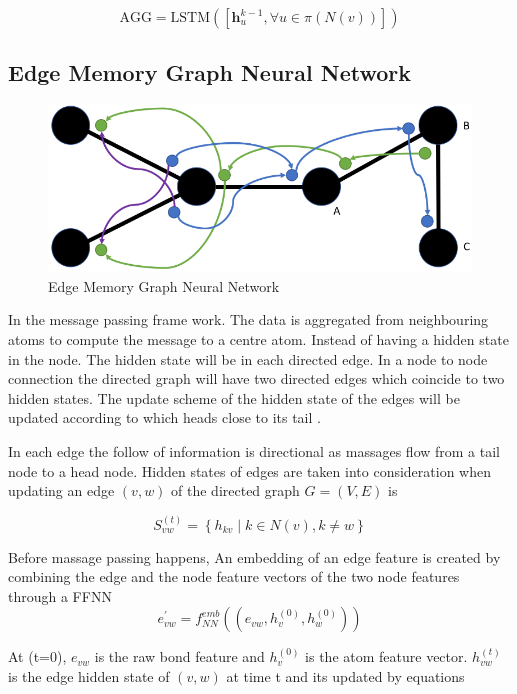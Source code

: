 \documentclass[10pt,twocolumn,letterpaper]{article}
\begin{document}
\begin{equation}
\mathrm{AGG}=\mathrm{LSTM}\left(\left[\mathbf{h}_{u}^{k-1}, \forall u \in \pi(N(v))\right]\right)
\end{equation}



\subsection{Edge Memory Graph Neural Network}

\begin{figure}[h!]
  \includegraphics[width=\linewidth]{edge.png}
  \caption{Edge Memory Graph Neural Network}
  \label{fig:graph}
\end{figure}

In the message passing frame work. The data is aggregated from neighbouring atoms to compute the message to a centre atom. Instead of having a hidden state in the node. The hidden state will be in each directed edge. In a node to node connection the directed graph will have two directed edges which coincide to two hidden states. The update scheme of the hidden state of the edges will be updated according to which heads close to its tail \cite{withnall2019}. 

In each edge the follow of information is directional as massages flow from a tail node to a head node. Hidden states of edges are taken into consideration when updating an edge $(v, w)$ of the directed graph $G=(V, E)$ is

$$
S_{v w}^{(t)}=\left\{h_{k v} \mid k \in N(v), k \neq w\right\}
$$

Before massage passing happens, An embedding of an edge feature is created by combining the edge and the node feature vectors of the two node features through a FFNN 
$$
e_{v w}^{\prime}=f_{N N}^{e m b}\left(\left(e_{v w}, h_{v}^{(0)}, h_{w}^{(0)}\right)\right)
$$

At (t=0), $e_{v w}$ is the raw bond feature and $h_{v}^{(0)}$ is the atom feature vector. $h_{v w}^{(t)}$ is the edge hidden state of $(v, w)$ at time t and its updated by equations 
\end{document}
